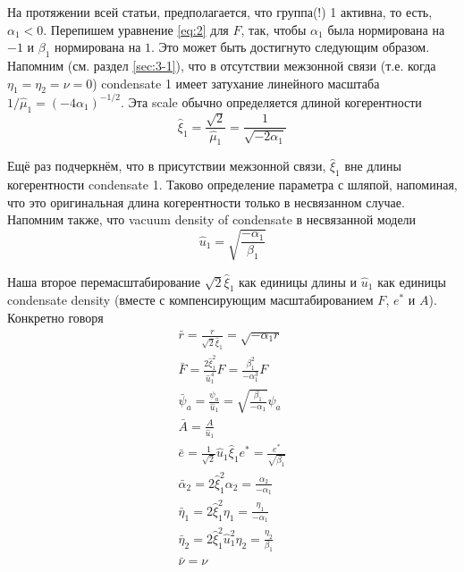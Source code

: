 На протяжении всей статьи, предполагается, что группа(!) 1
активна, то есть, \( \alpha_1 < 0 \). Перепишем уравнение \eqref{eq:2} для
\( F \), так, чтобы \( \alpha_1 \) была нормирована на \( -1 \) и
\( \beta_1 \) нормирована на \( 1 \). Это может быть достигнуто следующим
образом. Напомним (см. раздел \ref{sec:3-1}), что в отсутствии межзонной связи (т.е.
когда \( \eta_1 = \eta_2 = \nu = 0 \)) condensate 1 имеет затухание линейного
масштаба \( 1/\hat{\mu}_1 = (-4\alpha_1)^{-1/2} \). Эта scale обычно
определяется длиной когерентности
\begin{equation}
  \hat{\xi}_1 = \frac{\sqrt{2}}{\hat{\mu}_1} = \frac{1}{\sqrt{-2\alpha_1}}
  \label{eq:A-4}
\end{equation}

Ещё раз подчеркнём, что в присутствии межзонной связи, \( \hat{\xi}_1 \) вне
длины когерентности condensate 1. Таково определение параметра с шляпой,
напоминая, что это оригинальная длина когерентности только в несвязанном
случае. Напомним также, что vacuum density of condensate в несвязанной модели
\begin{equation}
  \hat{u}_1 = \sqrt{\frac{-\alpha_1}{\beta_1}}
  \label{eq:A-5}
\end{equation}

Наша второе перемасштабирование \( \sqrt{2}\hat{\xi}_1 \) как единицы длины
и \( \hat{u}_1 \) как единицы condensate density (вместе с компенсирующим
масштабированием \( F \), \( e^* \) и \( A \)). Конкретно говоря
\begin{gather}
  \bar{r} = \frac{r}{\sqrt{2}\hat{\xi}_1} = \sqrt{-\alpha_1 r} \nonumber \\
  \bar{F} = \frac{2\hat{\xi}^2_1}{\hat{u}^4_1}F =
    \frac{\beta^2_1}{-\alpha^3_1}F \nonumber \\
  \bar{\psi}_a = \frac{\psi_a}{\hat{u}_1} =
    \sqrt{\frac{\beta_1}{-\alpha_1}}\psi_a \nonumber \\
  \bar{A} = \frac{A}{\hat{u}_1} \\
  \bar{e} = \frac{1}{\sqrt{2}}\hat{u}_1\hat{\xi}_1 e^* =
    \frac{e^*}{\sqrt{\beta_1}} \nonumber \\
  \bar{\alpha}_2 = 2\hat{\xi}^2_1 \alpha_2 = \frac{\alpha_2}{-\alpha_1}
    \nonumber \\
  \bar{\eta}_1 = 2\hat{\xi}^2_1 \eta_1 = \frac{\eta_1}{-\alpha_1} \nonumber \\
  \bar{\eta}_2 = 2\hat{\xi}^2_1 \hat{u}^2_1 \eta_2 =
    \frac{\eta_2}{\beta_1} \nonumber \\
  \bar{\nu} = \nu \label{eq:A-6}
\end{gather}

